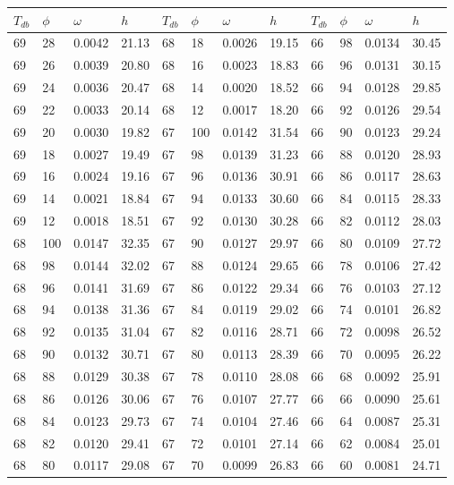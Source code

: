 \begin{tabular}{llll|llll|llll}
 \toprule 
\(T_{db}\) & \(\phi\) & \(\omega\) & \(h\) & \(T_{db}\) & \(\phi\) & \(\omega\) & \(h\) & \(T_{db}\) & \(\phi\) & \(\omega\) & \(h\)  \\ \midrule 
69 & 28 & 0.0042 & 21.13 & 68 & 18 & 0.0026 & 19.15 & 66 & 98 & 0.0134 & 30.45\\
69 & 26 & 0.0039 & 20.80 & 68 & 16 & 0.0023 & 18.83 & 66 & 96 & 0.0131 & 30.15\\
69 & 24 & 0.0036 & 20.47 & 68 & 14 & 0.0020 & 18.52 & 66 & 94 & 0.0128 & 29.85\\
69 & 22 & 0.0033 & 20.14 & 68 & 12 & 0.0017 & 18.20 & 66 & 92 & 0.0126 & 29.54\\
69 & 20 & 0.0030 & 19.82 & 67 & 100 & 0.0142 & 31.54 & 66 & 90 & 0.0123 & 29.24\\
69 & 18 & 0.0027 & 19.49 & 67 & 98 & 0.0139 & 31.23 & 66 & 88 & 0.0120 & 28.93\\
69 & 16 & 0.0024 & 19.16 & 67 & 96 & 0.0136 & 30.91 & 66 & 86 & 0.0117 & 28.63\\
69 & 14 & 0.0021 & 18.84 & 67 & 94 & 0.0133 & 30.60 & 66 & 84 & 0.0115 & 28.33\\
69 & 12 & 0.0018 & 18.51 & 67 & 92 & 0.0130 & 30.28 & 66 & 82 & 0.0112 & 28.03\\
68 & 100 & 0.0147 & 32.35 & 67 & 90 & 0.0127 & 29.97 & 66 & 80 & 0.0109 & 27.72\\
68 & 98 & 0.0144 & 32.02 & 67 & 88 & 0.0124 & 29.65 & 66 & 78 & 0.0106 & 27.42\\
68 & 96 & 0.0141 & 31.69 & 67 & 86 & 0.0122 & 29.34 & 66 & 76 & 0.0103 & 27.12\\
68 & 94 & 0.0138 & 31.36 & 67 & 84 & 0.0119 & 29.02 & 66 & 74 & 0.0101 & 26.82\\
68 & 92 & 0.0135 & 31.04 & 67 & 82 & 0.0116 & 28.71 & 66 & 72 & 0.0098 & 26.52\\
68 & 90 & 0.0132 & 30.71 & 67 & 80 & 0.0113 & 28.39 & 66 & 70 & 0.0095 & 26.22\\
68 & 88 & 0.0129 & 30.38 & 67 & 78 & 0.0110 & 28.08 & 66 & 68 & 0.0092 & 25.91\\
68 & 86 & 0.0126 & 30.06 & 67 & 76 & 0.0107 & 27.77 & 66 & 66 & 0.0090 & 25.61\\
68 & 84 & 0.0123 & 29.73 & 67 & 74 & 0.0104 & 27.46 & 66 & 64 & 0.0087 & 25.31\\
68 & 82 & 0.0120 & 29.41 & 67 & 72 & 0.0101 & 27.14 & 66 & 62 & 0.0084 & 25.01\\
68 & 80 & 0.0117 & 29.08 & 67 & 70 & 0.0099 & 26.83 & 66 & 60 & 0.0081 & 24.71\\

\end{tabular}
